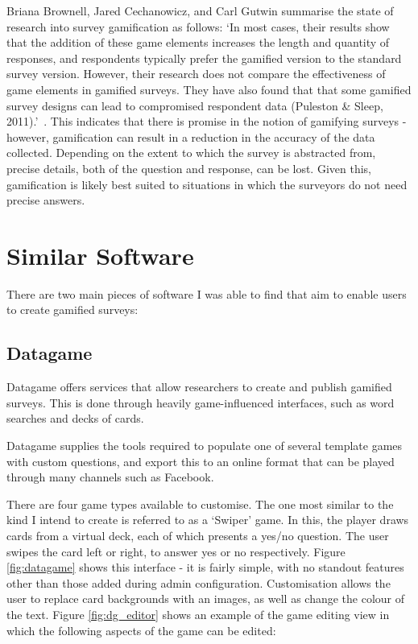 Briana Brownell, Jared Cechanowicz, and Carl Gutwin summarise the state of research into survey gamification as follows:
`In most cases, their results show that the addition of these game elements increases the length and quantity of responses, and respondents typically prefer the gamified version to the standard survey version. However, their research does not compare the effectiveness of game elements in gamified surveys. They have also found that that some gamified survey designs can lead to compromised respondent data (Puleston \& Sleep, 2011).'~\cite{SurveyGamificationResearch}.
This indicates that there is promise in the notion of gamifying surveys - however, gamification can result in a reduction in the accuracy of the data collected. Depending on the extent to which the survey is abstracted from, precise details, both of the question and response, can be lost. Given this, gamification is likely best suited to situations in which the surveyors do not need precise answers.

\section{Similar Software}
There are two main pieces of software I was able to find that aim to enable users to create gamified surveys:

\subsection{Datagame}
Datagame\cite{Datagame} offers services that allow researchers to create and publish gamified surveys. This is done through heavily game-influenced interfaces, such as word searches and decks of cards.

Datagame supplies the tools required to populate one of several template games with custom questions, and export this to an online format that can be played through many channels such as Facebook\cite{Facebook}. 

There are four game types available to customise. The one most similar to the kind I intend to create is referred to as a `Swiper' game. In this, the player draws cards from a virtual deck, each of which presents a yes/no question. The user swipes the card left or right, to answer yes or no respectively. Figure \ref{fig:datagame} shows this interface - it is fairly simple, with no standout features other than those added during admin configuration. Customisation allows the user to replace card backgrounds with an images, as well as change the colour of the text. Figure \ref{fig:dg_editor} shows an example of the game editing view in which the following aspects of the game can be edited:

